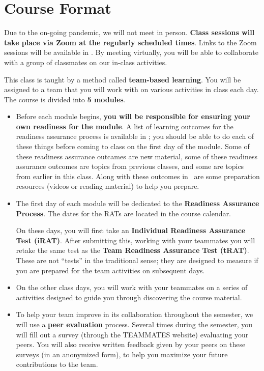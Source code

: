 \documentclass{article}
\begin{document}
\section*{\fontsize{12}{15}\selectfont Course Format}
Due to the on-going pandemic, we will not meet in person. \textbf{Class sessions will take place via Zoom at the regularly scheduled times}. Links to the Zoom sessions will be available in \LMS. By meeting virtually, you will be able to collaborate with a group of classmates on our in-class activities.

    This class is taught by a method called {\bf team-based learning}.  You will be assigned to a team that you will work with on various activities in class each day.  The course is divided into {\bf 5 modules}.
    \begin{itemize}
    \item Before each module begins, {\bf you will be responsible for ensuring your own readiness for the module}.  A list of learning outcomes for the readiness assurance process is available in \LMS; you should be able to do each of these things before coming to class on the first day of the module.  Some of these readiness assurance outcames are new material, some of these readiness assurance outcomes are topics from previous classes, and some are topics from earlier in this class.  Along with these outcomes in \LMS\ are some preparation resources (videos or reading material) to help you prepare.
    \item The first day of each module will be dedicated to the {\bf Readiness Assurance Process}.  The dates for the RATs are located in the course calendar.


    On these days, you will first take an {\bf Individual Readiness Assurance Test (iRAT)}.  After submitting this, working with your teammates you will retake the same test as the {\bf Team Readiness Assurance Test (tRAT)}.  These are not ``tests'' in the traditional sense; they are designed to measure if you are prepared for the team activities on subsequent days.

    \item On the other class days, you will work with your teammates on a series of activities designed to guide you through discovering the course material.

    \item To help your team improve in its collaboration throughout the semester, we will use a {\bf peer evaluation} process.  Several times during the semester, you will fill out a  survey (through the TEAMMATES website) evaluating your peers.  
    You will also receive written feedback given by your peers on these surveys (in an anonymized form), to help you maximize your future contributions to the team.

    \end{itemize}
\end{document}
